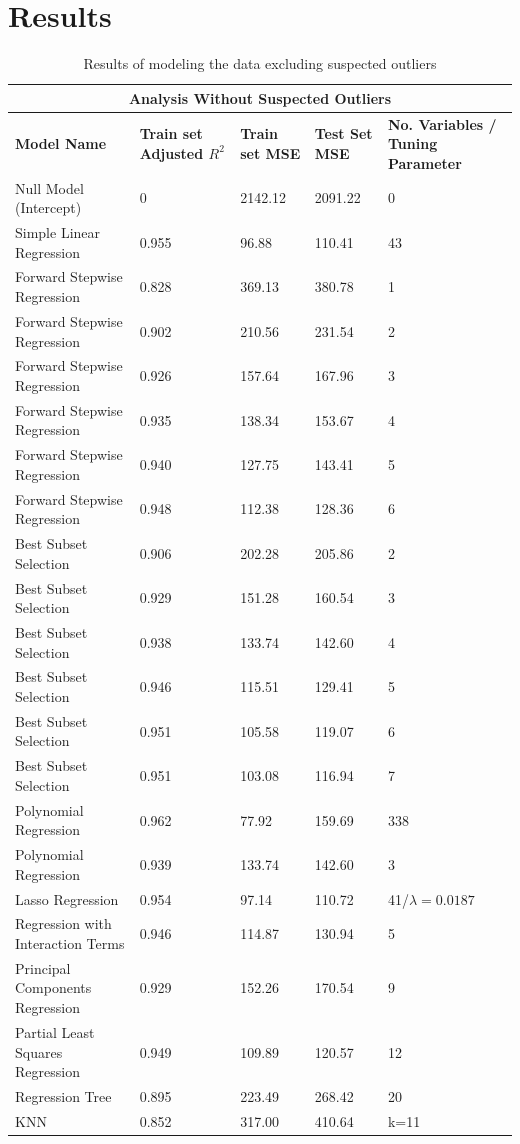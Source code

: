 \section{Results}
\def\arraystretch{1.5}%
\begin{table}
	\centering
	\begin{tabular}{|p{6.2cm}||p{2cm}|p{2cm}|p{2cm}|p{2.57cm}|}
		\hline
		\multicolumn{5}{|c|}{Analysis Without Suspected Outliers} \\
		\hline
		\textbf{\footnotesize Model Name} & \textbf{\footnotesize Train set Adjusted $R^2$} &\textbf{\footnotesize Train set MSE} & \textbf{\footnotesize Test Set MSE} & \textbf{\footnotesize No. Variables / Tuning Parameter}\\
		\hline
		Null Model (Intercept) & 0 & 2142.12 & 2091.22 & 0\\
		\hline
		Simple Linear Regression & 0.955 & 96.88 & 110.41 & 43\\
		\hline
		Forward Stepwise Regression & 0.828 & 369.13 & 380.78 & 1\\
		\hline
		Forward Stepwise Regression & 0.902 & 210.56 & 231.54 & 2\\
		\hline
		Forward Stepwise Regression & 0.926 & 157.64 & 167.96 & 3\\
		\hline
		Forward Stepwise Regression & 0.935 & 138.34 & 153.67 & 4\\
		\hline
		Forward Stepwise Regression & 0.940 & 127.75 & 143.41 & 5\\
		\hline
		Forward Stepwise Regression & 0.948 & 112.38 & 128.36 & 6\\
		\hline
		Best Subset Selection & 0.906 & 202.28 & 205.86 & 2\\
		\hline
		Best Subset Selection & 0.929 & 151.28 & 160.54 & 3\\
		\hline
		Best Subset Selection & 0.938 & 133.74 & 142.60 & 4\\
		\hline
		Best Subset Selection & 0.946 & 115.51 & 129.41 & 5\\
		\hline
		Best Subset Selection & 0.951 & 105.58 & 119.07 & 6\\
		\hline
		Best Subset Selection & 0.951 & 103.08 & 116.94 & 7\\
		\hline
		Polynomial Regression & 0.962 & 77.92 & 159.69 & 338\\
		\hline
		Polynomial Regression & 0.939 & 133.74 & 142.60 & 3\\
		\hline
		Lasso Regression & 0.954 & 97.14 & 110.72 & 41/$\lambda=0.0187$\\
		\hline
		Regression with Interaction Terms & 0.946 & 114.87 & 130.94 & 5\\
		\hline
		Principal Components Regression  & 0.929 & 152.26 & 170.54 & 9\\
		\hline
		Partial Least Squares Regression & 0.949 & 109.89 & 120.57 & 12\\
		\hline
		Regression Tree & 0.895 & 223.49 & 268.42 & 20\\
		\hline
		KNN & 0.852 & 317.00 & 410.64 & k=11\\
		\hline
	\end{tabular}
	\caption{Results of modeling the data excluding suspected outliers}
\end{table}
